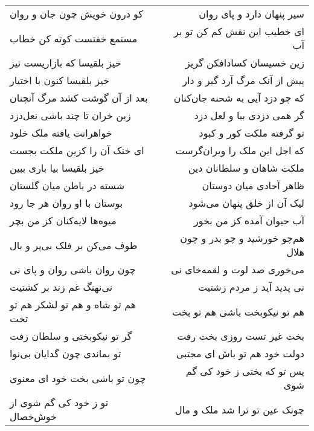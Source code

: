 \begin{center}
\begin{longtable}{l p{0.5cm} r}
کو درون خویش چون جان و روان
&&
سیر پنهان دارد و پای روان
\\
مستمع خفتست کوته کن خطاب
&&
ای خطیب این نقش کم کن تو بر آب
\\
خیز بلقیسا که بازاریست تیز
&&
زین خسیسان کسادافکن گریز
\\
خیز بلقیسا کنون با اختیار
&&
پیش از آنک مرگ آرد گیر و دار
\\
بعد از آن گوشت کشد مرگ آنچنان
&&
که چو دزد آیی به شحنه جان‌کنان
\\
زین خران تا چند باشی نعل‌دزد
&&
گر همی دزدی بیا و لعل دزد
\\
خواهرانت یافته ملک خلود
&&
تو گرفته ملکت کور و کبود
\\
ای خنک آن را کزین ملکت بجست
&&
که اجل این ملک را ویران‌گرست
\\
خیز بلقیسا بیا باری ببین
&&
ملکت شاهان و سلطانان دین
\\
شسته در باطن میان گلستان
&&
ظاهر آحادی میان دوستان
\\
بوستان با او روان هر جا رود
&&
لیک آن از خلق پنهان می‌شود
\\
میوه‌ها لایه‌کنان کز من بچر
&&
آب حیوان آمده کز من بخور
\\
طوف می‌کن بر فلک بی‌پر و بال
&&
هم‌چو خورشید و چو بدر و چون هلال
\\
چون روان باشی روان و پای نی
&&
می‌خوری صد لوت و لقمه‌خای نی
\\
نی‌نهنگ غم زند بر کشتیت
&&
نی پدید آید ز مردم زشتیت
\\
هم تو شاه و هم تو لشکر هم تو تخت
&&
هم تو نیکوبخت باشی هم تو بخت
\\
گر تو نیکوبختی و سلطان زفت
&&
بخت غیر تست روزی بخت رفت
\\
تو بماندی چون گدایان بی‌نوا
&&
دولت خود هم تو باش ای مجتبی
\\
چون تو باشی بخت خود ای معنوی
&&
پس تو که بختی ز خود کی گم شوی
\\
تو ز خود کی گم شوی از خوش‌خصال
&&
چونک عین تو ترا شد ملک و مال
\\
\end{longtable}
\end{center}
